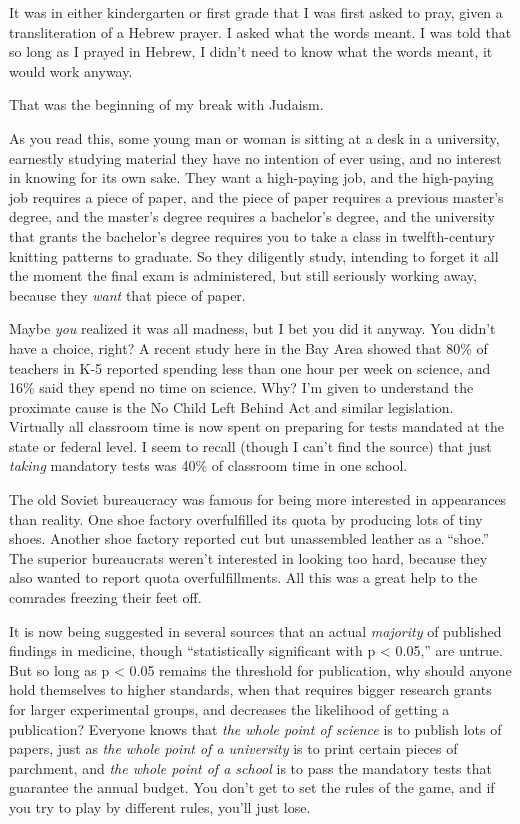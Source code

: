 \myendsectiontext


\bigskip


{
 It was in either kindergarten or first grade that I was first
asked to pray, given a transliteration of a Hebrew prayer. I asked what
the words meant. I was told that so long as I prayed in Hebrew, I
didn't need to know what the words meant, it would work
anyway. }

{
 That was the beginning of my break with Judaism.}

{
 As you read this, some young man or woman is sitting at a desk in
a university, earnestly studying material they have no intention of
ever using, and no interest in knowing for its own sake. They want a
high-paying job, and the high-paying job requires a piece of paper, and
the piece of paper requires a previous master's degree,
and the master's degree requires a
bachelor's degree, and the university that grants the
bachelor's degree requires you to take a class in
twelfth-century knitting patterns to graduate. So they diligently
study, intending to forget it all the moment the final exam is
administered, but still seriously working away, because they
\textit{want} that piece of paper.}

{
 Maybe \textit{you} realized it was all madness, but I bet you did
it anyway. You didn't have a choice, right? A recent
study here in the Bay Area showed that 80\% of teachers in K-5 reported
spending less than one hour per week on science, and 16\% said they
spend no time on science. Why? I'm given to understand
the proximate cause is the No Child Left Behind Act and similar
legislation. Virtually all classroom time is now spent on preparing for
tests mandated at the state or federal level. I seem to recall (though
I can't find the source) that just \textit{taking}
mandatory tests was 40\% of classroom time in one school.}

{
 The old Soviet bureaucracy was famous for being more interested in
appearances than reality. One shoe factory overfulfilled its quota by
producing lots of tiny shoes. Another shoe factory reported cut but
unassembled leather as a ``shoe.''
The superior bureaucrats weren't interested in looking
too hard, because they also wanted to report quota overfulfillments.
All this was a great help to the comrades freezing their feet off.}

{
 It is now being suggested in several sources that an actual
\textit{majority} of published findings in medicine, though
``statistically significant with p {\textless}
0.05,'' are untrue. But so long as p {\textless} 0.05
remains the threshold for publication, why should anyone hold
themselves to higher standards, when that requires bigger research
grants for larger experimental groups, and decreases the likelihood of
getting a publication? Everyone knows that \textit{the whole point of
science} is to publish lots of papers, just as \textit{the whole point
of a university} is to print certain pieces of parchment, and
\textit{the whole point of a school} is to pass the mandatory tests
that guarantee the annual budget. You don't get to set
the rules of the game, and if you try to play by different rules,
you'll just lose.}

